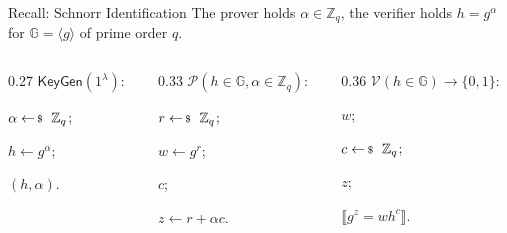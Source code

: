 \documentclass{zkdl-presentation-template}
\begin{document}
    \begin{frame}{Recall: Schnorr Identification}
        The prover holds $\alpha \in \mathbb{Z}_q$, the verifier holds $h = g^{\alpha}$ for $\mathbb{G} = \langle g \rangle$ of prime order $q$.

        \vspace{5pt}
        \footnotesize
        \begin{columns}[T]
            \begin{column}{0.27\textwidth}
                \colorbox{oc-blue-1}{$\mathsf{KeyGen}(1^{\lambda})$:}
                \begin{algoen}
                    \item $\alpha \leftarrowS \mathbb{Z}_q$;
                    \item $h \gets g^{\alpha}$;
                    \item {} $(h, \alpha)$.
                \end{algoen}
            \end{column}
            \begin{column}{0.33\textwidth}
                \colorbox{oc-blue-1}{$\mathcal{P}(h \in \mathbb{G}, \alpha \in \mathbb{Z}_q)$:}
                \begin{algoen}
                    \item $r \leftarrowS \mathbb{Z}_q$;
                    \item {} $w \gets g^r$;
                    \item {} $c$;
                    \item {} $z \gets r + \alpha c$.
                \end{algoen}
            \end{column}
            \begin{column}{0.36\textwidth}
                \colorbox{oc-blue-1}{$\mathcal{V}(h \in \mathbb{G}) \to \{0,1\}$:}
                \begin{algoen}
                    \item {} $w$;
                    \item {} $c \leftarrowS \mathbb{Z}_q$;
                    \item {} $z$;
                    \item {} $\llbracket g^z = wh^c \rrbracket$.
                \end{algoen}
            \end{column}
        \end{columns}
        \normalsize
        \pause


\end{frame}
\end{document}
